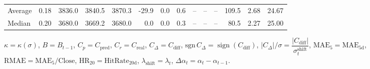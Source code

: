 \begin{threeparttable}
{\begin{tabular}{lrrrrrrrrrrrrr}
Average &     0.18 & 3836.0 & 3840.5 & 3870.3 &      -29.9 &                      0.0 &                 0.6 &         -- &        -- &             -- &            109.5 &            2.68 &                  24.67 \\
 Median &     0.20 & 3680.0 & 3669.2 & 3680.0 &        0.0 &                      0.0 &                 0.3 &         -- &        -- &             -- &             80.5 &            2.27 &                  25.00 \\
\bottomrule
\end{tabular}
}
\begin{tablenotes}\footnotesize
\item $\kappa=\kappa(\sigma)$, $B=B_{t-1}$, $C_p=C_{\text{pred}}$, $C_r=C_{\text{real}}$, $C_\Delta=C_{\text{diff}}$, $\mathrm{sgn}\,C_\Delta=\operatorname{sign}(C_{\text{diff}})$, $|C_\Delta|/\sigma=\dfrac{|C_{\text{diff}}|}{\sigma_t^{\text{shift}}}$, $\mathrm{MAE}_5=\mathrm{MAE}_{5\text{d}}$, $\mathrm{RMAE}= \mathrm{MAE}_5 / \text{Close}$, $\mathrm{HR}_{20}=\mathrm{HitRate}_{20\text{d}}$, 
$\lambda_{\text{shift}}=\lambda_t$, 
$\Delta\alpha_t=\alpha_t-\alpha_{t-1}$.
\end{tablenotes}
\end{threeparttable}
\endgroup

